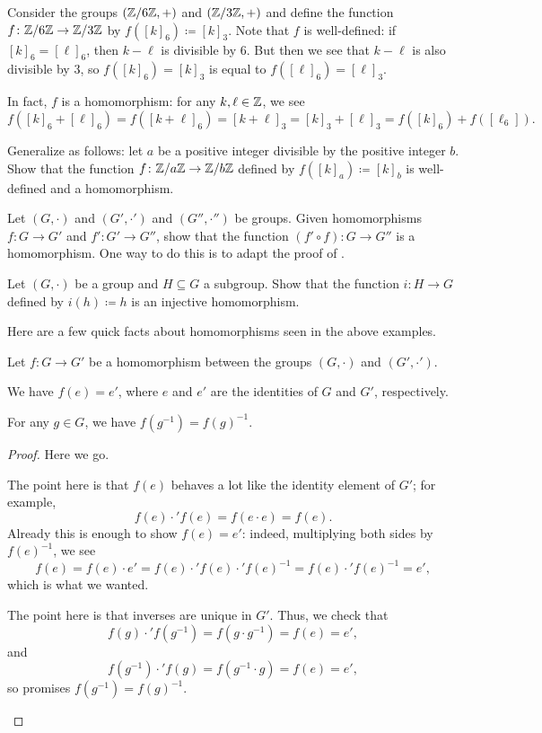 \documentclass[../notes.tex]{subfiles}
\begin{document}
\begin{example} \label{ex:z6z-to-z3z}
    Consider the groups $(\mathbb Z/6\mathbb Z,+)$ and $(\mathbb Z/3\mathbb Z,+)$ and define the function $f\colon\mathbb Z/6\mathbb Z\to\mathbb Z/3\mathbb Z$ by $f([k]_6)\coloneqq[k]_3$. Note that $f$ is well-defined: if $[k]_6=[\ell]_6$, then $k-\ell$ is divisible by $6$. But then we see that $k-\ell$ is also divisible by $3$, so $f([k]_6)=[k]_3$ is equal to $f([\ell]_6)=[\ell]_3$.
    
    In fact, $f$ is a homomorphism: for any $k,\ell\in\mathbb Z$, we see
    \[f([k]_6+[\ell]_6)=f([k+\ell]_6)=[k+\ell]_3=[k]_3+[\ell]_3=f([k]_6)+f([\ell_6]).\]
\end{example}
\begin{exe}
    Generalize  as follows: let $a$ be a positive integer divisible by the positive integer $b$. Show that the function $f\colon\mathbb Z/a\mathbb Z\to\mathbb Z/b\mathbb Z$ defined by $f([k]_a)\coloneqq[k]_b$ is well-defined and a homomorphism.
\end{exe}
\begin{exe}
    Let $(G,\cdot)$ and $(G',\cdot')$ and $(G'',\cdot'')$ be groups. Given homomorphisms $f\colon G\to G'$ and $f'\colon G'\to G''$, show that the function $(f'\circ f)\colon G\to G''$ is a homomorphism. One way to do this is to adapt the proof of .
\end{exe}
\begin{exe} \label{exe:subgroup-hom}
    Let $(G,\cdot)$ be a group and $H\subseteq G$ a subgroup. Show that the function $i\colon H\to G$ defined by $i(h)\coloneqq h$ is an injective homomorphism.
\end{exe}
Here are a few quick facts about homomorphisms seen in the above examples.
\begin{lemma} \label{lem:basic-hom}
    Let $f\colon G\to G'$ be a homomorphism between the groups $(G,\cdot)$ and $(G',\cdot')$.
    \begin{listalph}
        \item We have $f(e)=e'$, where $e$ and $e'$ are the identities of $G$ and $G'$, respectively.
        \item For any $g\in G$, we have $f\left(g^{-1}\right)=f(g)^{-1}$.
    \end{listalph}
\end{lemma}
\begin{proof}
    Here we go.
    \begin{listalph}
        \item The point here is that $f(e)$ behaves a lot like the identity element of $G'$; for example,
        \[f(e)\cdot'f(e)=f(e\cdot e)=f(e).\]
        Already this is enough to show $f(e)=e'$: indeed, multiplying both sides by $f(e)^{-1}$, we see
        \[f(e)=f(e)\cdot e'=f(e)\cdot'f(e)\cdot'f(e)^{-1}=f(e)\cdot'f(e)^{-1}=e',\]
        which is what we wanted.
        \item The point here is that inverses are unique in $G'$. Thus, we check that
        \[f(g)\cdot'f\left(g^{-1}\right)=f\left(g\cdot g^{-1}\right)=f(e)=e',\]
        and
        \[f\left(g^{-1}\right)\cdot'f(g)=f\left(g^{-1}\cdot g\right)=f(e)=e',\]
        so  promises $f\left(g^{-1}\right)=f(g)^{-1}$.
        \qedhere
    \end{listalph}
\end{proof}
\end{document}
